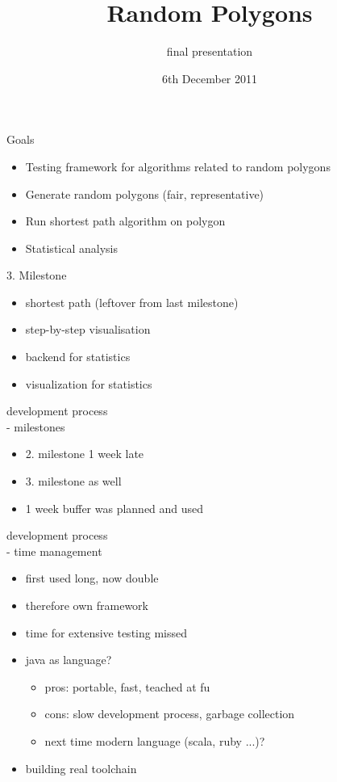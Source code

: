 \documentclass[ucs,9ptb]{beamer}
\title[Random Polygons]{Random Polygons}
\subtitle{final presentation}
\institute[FU Berlin]{Freie Universität Berlin}
\date[06.12.2011]{6th December 2011}
\begin{document}
\begin{frame}[plain]
  \titlepage
\end{frame}


\begin{frame}{Goals}
	\begin{itemize}
	\item Testing framework for algorithms related to random polygons
	\item Generate random polygons (fair, representative)
	\item Run shortest path algorithm on polygon
	\item Statistical analysis
	\end{itemize}
\end{frame}

\begin{frame}{3. Milestone}
  \begin{itemize}
  \item shortest path (leftover from last milestone)
  \item step-by-step visualisation
  \item backend for statistics
  \item visualization for statistics
  \end{itemize}
\end{frame}

\begin{frame}{development process\\- milestones}
  \begin{itemize}
    \item 2. milestone 1 week late
    \item 3. milestone as well
    \item 1 week buffer was planned and used
  \end{itemize}
\end{frame}

\begin{frame}{development process\\- time management}
  \begin{itemize}
    \item first used long, now double
    \item therefore own framework
    \item time for extensive testing missed
    \item java as language?
    \begin{itemize}
      \item pros: portable, fast, teached at fu
      \item cons: slow development process, garbage collection
      \item next time modern language (scala, ruby ...)?
    \end{itemize}
    \item building real toolchain
  \end{itemize}
\end{frame}
\end{document}
